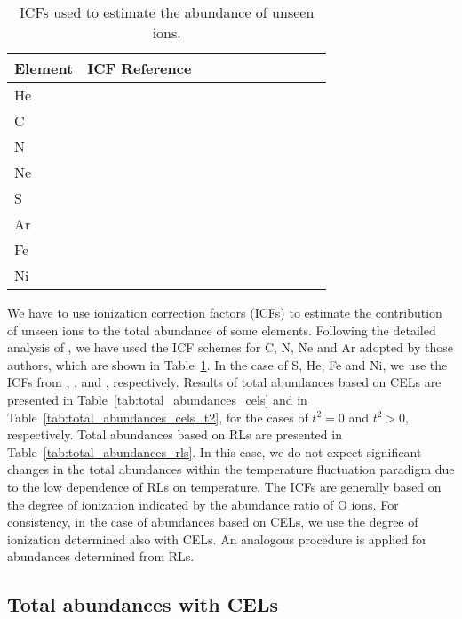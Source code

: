 \documentclass[fleqn,usenatbib]{mnras}
\begin{document}
\begin{table}
\centering
\caption{ICFs used to estimate the abundance of unseen ions.}
\label{tab:ICFs_used}
\begin{tabular}{llccccccccc}
\hline
Element & ICF Reference  \\
\hline
He&\citet{kunthsargent83}\\
C&\citet{berg19}\\
N&\citet{Peimbert69}\\
Ne&\citet{Peimbert69}\\
S& \citet{stasinska78}\\
Ar&\citet{izotov06}\\
Fe&\citet{rodriguez05}\\
Ni&\citet{delgadoinglada16}\\
\hline
\end{tabular}
\end{table}

We have to use ionization correction factors (ICFs) to estimate the contribution of unseen ions to the total abundance of some elements. Following the detailed analysis of \citet{arellanocorodova20}, we have used the ICF schemes for C, N, Ne and Ar adopted by those authors, which are shown in Table~\ref{tab:ICFs_used}. In the case of S, He, Fe and Ni, we use the ICFs from \citet{stasinska78}, \citet{kunthsargent83}, \citet{rodriguez05} and \citet{delgadoinglada16}, respectively. Results of total abundances based on CELs are presented in Table~\ref{tab:total_abundances_cels} and in Table~\ref{tab:total_abundances_cels_t2}, for the cases of $t^2=0$ and $t^2>0$, respectively. Total abundances based on RLs are presented in Table~\ref{tab:total_abundances_rls}. In this case, we do not expect significant changes in the total abundances within the temperature fluctuation paradigm due to the low dependence of RLs on temperature. The ICFs are generally based on the degree of ionization indicated by the abundance ratio of O ions. For consistency, in the case of abundances based on CELs, we use the degree of ionization determined also with CELs. An analogous procedure is applied for abundances determined from RLs.



\subsection{Total abundances with CELs}
\label{subsec:total_abun_CELS}
\end{document}
